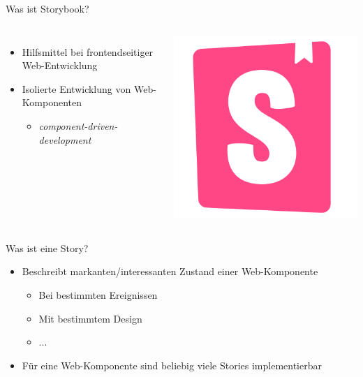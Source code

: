 \documentclass{beamer}
\begin{document}
\begin{frame}{Was ist Storybook?}
	\begin{columns}
		\begin{itemize}
			\item Hilfsmittel bei frontendseitiger Web-Entwicklung
			\item Isolierte Entwicklung von Web-Komponenten
			\begin{itemize}
				\item \emph{component-driven-development}
			\end{itemize}
		\end{itemize}
		
		\includegraphics[width=\linewidth]{Images/storybook_logo.png}
	\end{columns}
\end{frame}

\begin{frame}{Was ist eine Story?}
	\begin{itemize}
		\item Beschreibt markanten/interessanten Zustand einer Web-Komponente
			\begin{itemize}
				\item Bei bestimmten Ereignissen
				\item Mit bestimmtem Design
				\item ...
			\end{itemize}
		\item Für eine Web-Komponente sind beliebig viele Stories implementierbar
	\end{itemize}
\end{frame}
\end{document}
